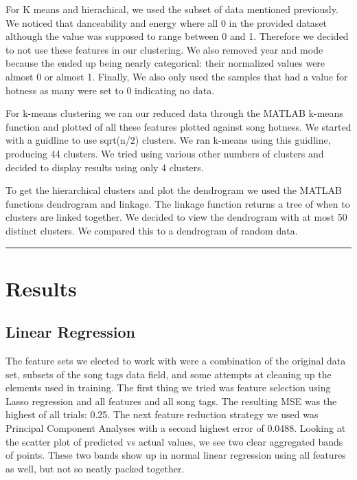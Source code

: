 \documentclass[12pt]{article}
\newcommand{\horizontalLine}{
	\begin{center}
		\hrule width 1.0\textwidth
	\end{center}
}
\begin{document}
For K means and hierachical, we used the subset of data mentioned previously. We noticed that danceability and energy where all 0 in the provided dataset although the value was supposed to range between 0 and 1. Therefore we decided to not use these features in our clustering. We also removed year and mode because the ended up being nearly categorical: their normalized values were almost 0 or almost 1. Finally, We also only used the samples that had a value for hotness as many were set to 0 indicating no data. 

For k-means clustering we ran our reduced data through the MATLAB k-means function and plotted of all these features plotted against song hotness. We started with a guidline to use sqrt(n/2) clusters. We ran k-means using this guidline, producing 44 clusters. We tried using various other numbers of clusters and decided to display results using only 4 clusters.

To get the hierarchical clusters and plot the dendrogram we used the MATLAB functions dendrogram and linkage. The linkage function returns a tree of when to clusters are linked together. We decided to view the dendrogram with at most 50 distinct clusters. We compared this to a dendrogram of random data.

\horizontalLine
\section{Results}
\label{sec:results}

\subsection{Linear Regression}
\label{subsec:linearRegressionResults}
The feature sets we elected to work with were a combination of the original data set, subsets of the song tags data field, and some attempts at cleaning up the elements used in training. The first thing we tried was feature selection using Lasso regression and all features and all song tags. The resulting MSE was the highest of all trials: 0.25. The next feature reduction strategy we used was Principal Component Analyses with a second highest error of 0.0488. Looking at the scatter plot of predicted vs actual values, we see two clear aggregated bands of points. These two bands show up in normal linear regression using all features as well, but not so neatly packed together.
\end{document}
